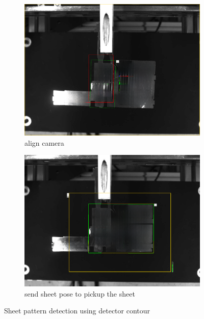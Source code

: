 \begin{figure}[h]
    \centering
    \begin{subfigure}[b]{0.48\textwidth}
        \centering
        \includegraphics[width=\textwidth]{figures/sheet-pickup/camera-align.png}
        \caption{align camera}
        \label{subfig:sheet-scan}
    \end{subfigure}\hspace{0.1cm}
    \begin{subfigure}[b]{0.48\textwidth}
        \centering
        \includegraphics[width=\textwidth]{figures/sheet-pickup/sheet-pose.png}
        \caption{send sheet pose to pickup the sheet}
        \label{subfig:sheet-taken}
    \end{subfigure}
    \caption{Sheet pattern detection using detector contour}
    \label{fig:sheet-scanning}
\end{figure}

